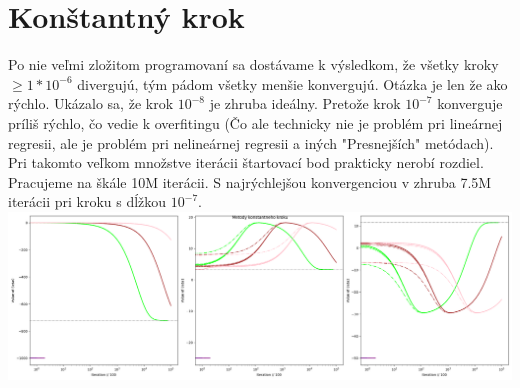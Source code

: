 \documentclass{article}
\begin{document}
\section{Konštantný krok}
Po nie veľmi zložitom programovaní sa dostávame k výsledkom, že všetky kroky $\geq 1*10^{-6}$ divergujú, tým pádom všetky menšie konvergujú. Otázka je len že ako rýchlo. Ukázalo sa, že krok $10^{-8}$ je zhruba ideálny. Pretože krok $10^{-7}$ konverguje príliš rýchlo, čo vedie k overfitingu (Čo ale technicky nie je problém pri lineárnej regresii, ale je problém pri nelineárnej regresii a iných "Presnejších" metódach).\\
Pri takomto veľkom množstve iterácii štartovací bod prakticky nerobí rozdiel.  Pracujeme na škále 10M iterácii. S najrýchlejšou konvergenciou v zhruba 7.5M iterácii pri kroku s dĺžkou $10^{-7}$.\\ \includegraphics[width=\textwidth]{konstantny_krok.png} \\
\end{document}
